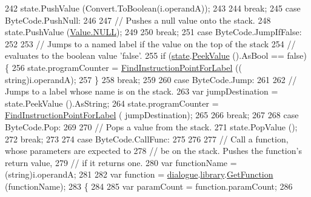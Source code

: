 \begin{DoxyCode}
242                 state.PushValue (Convert.ToBoolean(i.operandA));
243 
244                 \textcolor{keywordflow}{break};
245             \textcolor{keywordflow}{case} ByteCode.PushNull:
246 
247                 \textcolor{comment}{// Pushes a null value onto the stack.}
248                 state.PushValue (\hyperlink{a00086_a1ed2964965baca8621c45efa23f37660}{Value.NULL});
249 
250                 \textcolor{keywordflow}{break};
251             \textcolor{keywordflow}{case} ByteCode.JumpIfFalse:
252 
253                 \textcolor{comment}{// Jumps to a named label if the value on the top of the stack}
254                 \textcolor{comment}{// evaluates to the boolean value 'false'.}
255                 \textcolor{keywordflow}{if} (\hyperlink{a00072_a70f2ce6201cdd2430ceaa764ac614ca0}{state}.\hyperlink{a00075_a54fd5b64ec94e937e771846167242dc2}{PeekValue} ().AsBool == \textcolor{keyword}{false}) \{
256                     state.programCounter = \hyperlink{a00072_af613c8b2d098678b6ea05b509c0a0cb6}{FindInstructionPointForLabel} ((\textcolor{keywordtype}{
      string})i.operandA);
257                 \}
258                 \textcolor{keywordflow}{break};
259 
260             \textcolor{keywordflow}{case} ByteCode.Jump:
261 
262                 \textcolor{comment}{// Jumps to a label whose name is on the stack.}
263                 var jumpDestination = state.PeekValue ().AsString;
264                 state.programCounter = \hyperlink{a00072_af613c8b2d098678b6ea05b509c0a0cb6}{FindInstructionPointForLabel} (
      jumpDestination);
265 
266                 \textcolor{keywordflow}{break};
267 
268             \textcolor{keywordflow}{case} ByteCode.Pop:
269 
270                 \textcolor{comment}{// Pops a value from the stack.}
271                 state.PopValue ();
272                 \textcolor{keywordflow}{break};
273 
274             \textcolor{keywordflow}{case} ByteCode.CallFunc:
275 
276 
277                 \textcolor{comment}{// Call a function, whose parameters are expected to}
278                 \textcolor{comment}{// be on the stack. Pushes the function's return value,}
279                 \textcolor{comment}{// if it returns one.}
280                 var functionName = (string)i.operandA;
281 
282                 var \textcolor{keyword}{function} = \hyperlink{a00072_ac506426c503da5f033247c29e11c5e82}{dialogue}.\hyperlink{a00036_ae660d4cfb6e296358d2f61d8ee74c66a}{library}.\hyperlink{a00049_aacfb1f00ad8aa3921941b8d8af0960e0}{GetFunction} (functionName);
283                 \{
284 
285                     var paramCount = function.paramCount;
286 

\end{DoxyCode}
